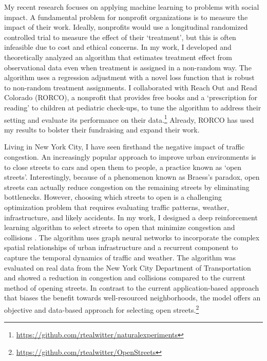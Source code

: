\documentclass[11pt]{article}
\begin{document}
My recent research focuses on applying machine learning to problems with social impact.
A fundamental problem for nonprofit organizations is to measure the impact of their work.
Ideally, nonprofits would use a longitudinal randomized controlled trial to measure the effect of their `treatment', but this is often infeasible due to cost and ethical concerns.
In my work, I developed and theoretically analyzed an algorithm that estimates treatment effect from observational data even when treatment is assigned in a non-random way.
The algorithm uses a regression adjustment with a novel loss function that is robust to non-random treatment assignments.
I collaborated with Reach Out and Read Colorado (RORCO), a nonprofit that provides free books and a `prescription for reading' to children at pediatric check-ups, to tune the algorithm to address their setting and evaluate its performance on their data.\footnote{\url{https://github.com/rtealwitter/naturalexperiments}}
Already, RORCO has used my results to bolster their fundraising and expand their work.

Living in New York City, I have seen firsthand the negative impact of traffic congestion.
An increasingly popular approach to improve urban environments is to close streets to cars and open them to people, a practice known as `open streets'.
Interestingly, because of a phenomenon known as Braess's paradox, open streets can actually reduce congestion on the remaining streets by eliminating bottlenecks.
However, choosing which streets to open is a challenging optimization problem that requires evaluating traffic patterns, weather, infrastructure, and likely accidents.
In my work, I designed a deep reinforcement learning algorithm to select streets to open that minimize congestion and collisions \cite{witter2024i}.
The algorithm uses graph neural networks to incorporate the complex spatial relationships of urban infrastructure and a recurrent component to capture the temporal dynamics of traffic and weather.
The algorithm was evaluated on real data from the New York City Department of Transportation and showed a reduction in congestion and collisions compared to the current method of opening streets.
In contrast to the current application-based approach that biases the benefit towards well-resourced neighborhoods, the model offers an objective and data-based approach for selecting open streets.\footnote{\url{https://github.com/rtealwitter/OpenStreets}}
\end{document}
